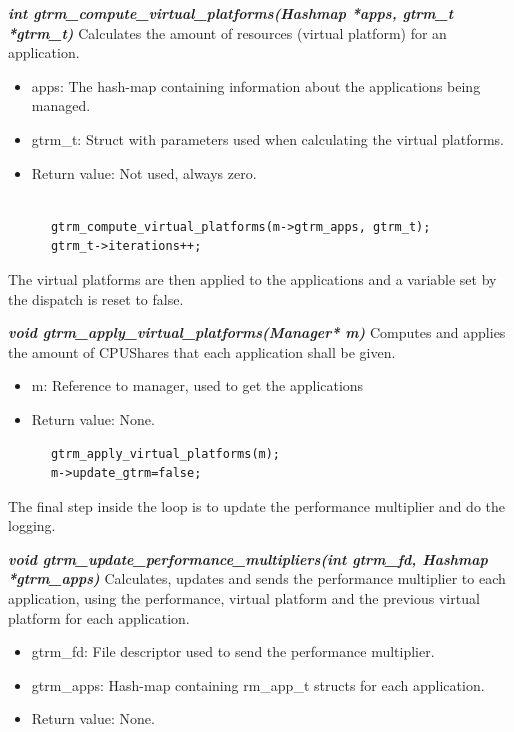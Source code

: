 \documentclass[nobiblatex]{LTHthesis}
\begin{document}
\begin{framed}
		\begin{flushleft}
				\textbf{\emph{{int gtrm\_compute\_virtual\_platforms(Hashmap *apps, gtrm\_t *gtrm\_t)}}} \newline
				Calculates the amount of resources (virtual platform) for an application.
				\begin{itemize}
				\item apps: The hash-map containing information about the applications being managed.
				\item gtrm\_t: Struct with parameters used when calculating the virtual platforms.
				\item Return value: Not used, always zero.
				\end{itemize}
		\end{flushleft}	
\end{framed}

\begin{verbatim}

      gtrm_compute_virtual_platforms(m->gtrm_apps, gtrm_t);
      gtrm_t->iterations++;
\end{verbatim}
The virtual platforms are then applied to the applications and a variable set by the dispatch is reset to false.
\begin{framed}
		\begin{flushleft}
				\textbf{\emph{{void gtrm\_apply\_virtual\_platforms(Manager* m)}}} \newline
				Computes and applies the amount of CPUShares that each application shall be given.
				\begin{itemize}
				\item m: Reference to manager, used to get the applications
				\item Return value: None.
				\end{itemize}
		\end{flushleft}	
\end{framed}
\begin{verbatim}
      gtrm_apply_virtual_platforms(m); 
      m->update_gtrm=false;																	
\end{verbatim}
The final step inside the loop is to update the performance multiplier and do the logging.
\begin{framed}
		\begin{flushleft}
				\textbf{\emph{{void gtrm\_update\_performance\_multipliers(int gtrm\_fd, Hashmap *gtrm\_apps)}}} \newline
				Calculates, updates and sends the performance multiplier to each application, using the performance, virtual platform and the previous virtual platform for each application.
				\begin{itemize} 
				\item gtrm\_fd: File descriptor used to send the performance multiplier.
				\item gtrm\_apps: Hash-map containing rm\_app\_t structs for each application.
				\item Return value: None.
				\end{itemize}

		\end{flushleft}	
\end{framed}
\end{document}
